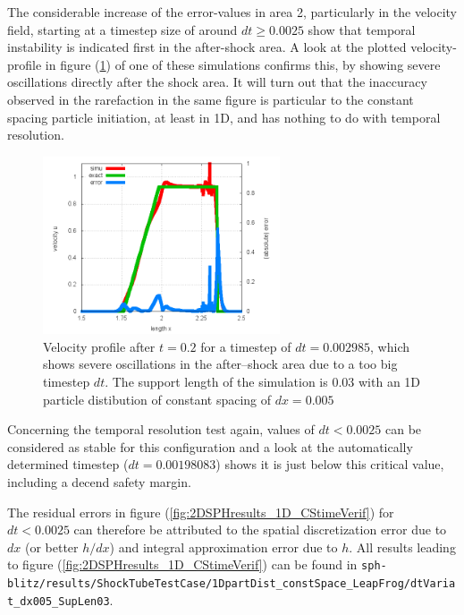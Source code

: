 \documentclass{report}
\begin{document}
The considerable increase of the error-values in area 2, particularly in the velocity field, starting at a timestep size of around $dt\geq0.0025$ show that temporal instability is indicated first in the after-shock area. A look at the plotted velocity-profile in figure (\ref{fig:2DSPHresults_dt_variat_oscillationU}) of one of these simulations confirms this, by showing severe oscillations directly after the shock area. It will turn out that the inaccuracy observed in the rarefaction in the same figure is particular to the constant spacing particle initiation, at least in 1D, and has nothing to do with temporal resolution.

\begin{figure}[!htbp]

\centering
\label{fig:2DSPHresults_dt_variat_oscillationU}
\includegraphics[width=7cm]{Graphics/results/ShockTube/1D_CS_LF_SD/dtVariat_dx005_SupLen03_dt03_Oscillations/Err_u00200000}
\caption[Velocity oscillations due to temporal instability]{Velocity profile after $t=0.2$ for a timestep of $dt=0.002985$, which shows severe oscillations in the after--shock area due to a too big timestep $dt$. The support length of the simulation is $0.03$ with an 1D particle distibution of constant spacing of $dx=0.005$ }

\end{figure}

Concerning the temporal resolution test again, values of $dt<0.0025$ can be considered as stable for this configuration and a look at the automatically determined timestep ($dt=0.00198083$) shows it is just below this critical value, including a decend safety margin.

The residual errors in figure (\ref{fig:2DSPHresults_1D_CStimeVerif}) for $dt<0.0025$ can therefore be attributed to the spatial discretization error due to $dx$ (or better $h/dx$) and integral approximation error due to $h$. All results leading to figure (\ref{fig:2DSPHresults_1D_CStimeVerif}) can be found in {\tt sph-blitz/results/ShockTubeTestCase/1DpartDist\_constSpace\_LeapFrog/dtVariat\_dx005\_SupLen03}.
\end{document}
